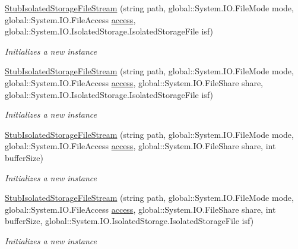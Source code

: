 \begin{DoxyCompactItemize}
\hyperlink{class_system_1_1_i_o_1_1_isolated_storage_1_1_fakes_1_1_stub_isolated_storage_file_stream_a42f85826a4f7ecb6e8f2c2788e801ec7}{Stub\-Isolated\-Storage\-File\-Stream} (string path, global\-::\-System.\-I\-O.\-File\-Mode mode, global\-::\-System.\-I\-O.\-File\-Access \hyperlink{jquery-1_810_82-vsdoc_8js_a130ad18d21e14ee566dbf4eb185f2bda}{access}, global\-::\-System.\-I\-O.\-Isolated\-Storage.\-Isolated\-Storage\-File isf)
\begin{DoxyCompactList}\small\item\em Initializes a new instance\end{DoxyCompactList}\item 
\hyperlink{class_system_1_1_i_o_1_1_isolated_storage_1_1_fakes_1_1_stub_isolated_storage_file_stream_a0ebbb9426172a6dc428a5abe7190549a}{Stub\-Isolated\-Storage\-File\-Stream} (string path, global\-::\-System.\-I\-O.\-File\-Mode mode, global\-::\-System.\-I\-O.\-File\-Access \hyperlink{jquery-1_810_82-vsdoc_8js_a130ad18d21e14ee566dbf4eb185f2bda}{access}, global\-::\-System.\-I\-O.\-File\-Share share, global\-::\-System.\-I\-O.\-Isolated\-Storage.\-Isolated\-Storage\-File isf)
\begin{DoxyCompactList}\small\item\em Initializes a new instance\end{DoxyCompactList}\item 
\hyperlink{class_system_1_1_i_o_1_1_isolated_storage_1_1_fakes_1_1_stub_isolated_storage_file_stream_a0829137202c24836628b57f7ef707a8d}{Stub\-Isolated\-Storage\-File\-Stream} (string path, global\-::\-System.\-I\-O.\-File\-Mode mode, global\-::\-System.\-I\-O.\-File\-Access \hyperlink{jquery-1_810_82-vsdoc_8js_a130ad18d21e14ee566dbf4eb185f2bda}{access}, global\-::\-System.\-I\-O.\-File\-Share share, int buffer\-Size)
\begin{DoxyCompactList}\small\item\em Initializes a new instance\end{DoxyCompactList}\item 
\hyperlink{class_system_1_1_i_o_1_1_isolated_storage_1_1_fakes_1_1_stub_isolated_storage_file_stream_a8db60fe72cbb4c2a7d8bb05d2b8886ed}{Stub\-Isolated\-Storage\-File\-Stream} (string path, global\-::\-System.\-I\-O.\-File\-Mode mode, global\-::\-System.\-I\-O.\-File\-Access \hyperlink{jquery-1_810_82-vsdoc_8js_a130ad18d21e14ee566dbf4eb185f2bda}{access}, global\-::\-System.\-I\-O.\-File\-Share share, int buffer\-Size, global\-::\-System.\-I\-O.\-Isolated\-Storage.\-Isolated\-Storage\-File isf)
\begin{DoxyCompactList}\small\item\em Initializes a new instance\end{DoxyCompactList}\item 

\end{DoxyCompactItemize}
